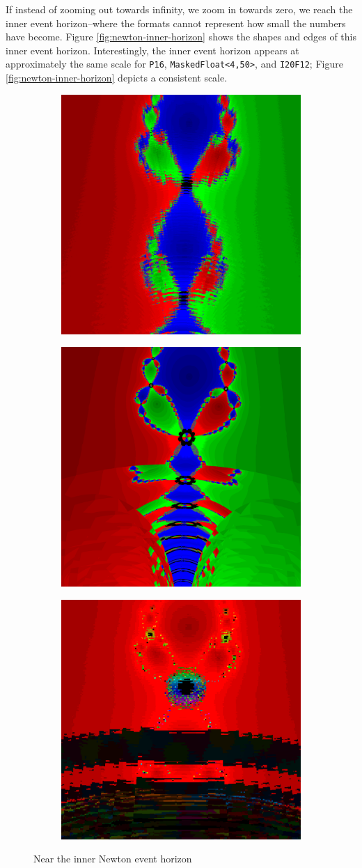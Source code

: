 \documentclass[sigconf,authorversion,nonacm]{acmart}
\begin{document}
If instead of zooming out towards infinity, we zoom in towards zero, we reach the
inner event horizon--where the formats cannot represent how small the numbers have become.
Figure \ref{fig:newton-inner-horizon} shows the shapes and edges of this inner
event horizon. Interestingly, the inner event horizon appears at approximately the
same scale for \texttt{P16}, \texttt{MaskedFloat<4,50>}, and \texttt{I20F12}; Figure \ref{fig:newton-inner-horizon} depicts a consistent scale.

\begin{figure}
    \begin{subfigure}[P16]
        \centering
        \includegraphics[width=0.30\linewidth]{images/near_horizon/P16_near.png}
    \end{subfigure}
    \quad
    \begin{subfigure}[MaskedFloat<4,50>]
        \centering
        \includegraphics[width=0.30\linewidth]{images/near_horizon/MaskedFloat_450_near.png}
    \end{subfigure}
    \quad
    \begin{subfigure}[I20F12]
        \centering
        \includegraphics[width=0.30\linewidth]{images/near_horizon/I20F12_near.png}
    \end{subfigure}
    \caption{Near the inner Newton event horizon}
    \label{fig:newton-near-horizon}
\end{figure}
\end{document}
